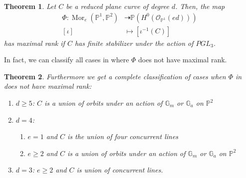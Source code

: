 \documentclass[11pt,reqno]{amsart}
\theoremstyle{plain}
\newtheorem{theorem}{Theorem}[section]
\newtheorem{lemma}[theorem]{Lemma}
\theoremstyle{definition}
\theoremstyle{remark}
\numberwithin{equation}{section}
\numberwithin{equation}{section}
\newcommand{\OO}{\mathscr{O}}
\newcommand{\PP}{\mathbb{P}}
\begin{document}
\begin{theorem}
\label{thmplanecurves}
Let $C$ be a reduced plane curve of degree $d$. Then, the map
\begin{align*}
    \Phi: \operatorname{Mor}_e(\mathbb{P}^1,\mathbb{P}^2)&\dashrightarrow \mathbb{P}(H^0(\OO_{\PP^1}(ed)))\\
    [\iota]&\mapsto [\iota^{-1}(C)]
\end{align*}
has maximal rank if $C$ has finite stabilizer under the action of $PGL_{3}$. %
\end{theorem}
In fact, we can classify all cases in  where $\Phi$ does not have maximal rank.
\begin{theorem}
\label{classification}
Furthermore we get a complete classification of cases when $\Phi$ in  does not have maximal rank:
\begin{enumerate}
    \item $d\geq 5$: $C$ is a union of orbits under an action of $\mathbb{G}_m$ or $\mathbb{G}_a$ on $\PP^2$
    \item $d=4$:
    \begin{enumerate}
        \item $e=1$ and $C$ is the union of four concurrent lines
        \item $e\geq 2$ and $C$ is a union of orbits under an action of $\mathbb{G}_m$ or $\mathbb{G}_a$ on $\PP^2$
    \end{enumerate}
    \item $d=3$: $e\geq 2$ and $C$ is union of concurrent lines.
\end{enumerate}
\end{theorem}

\end{document}
